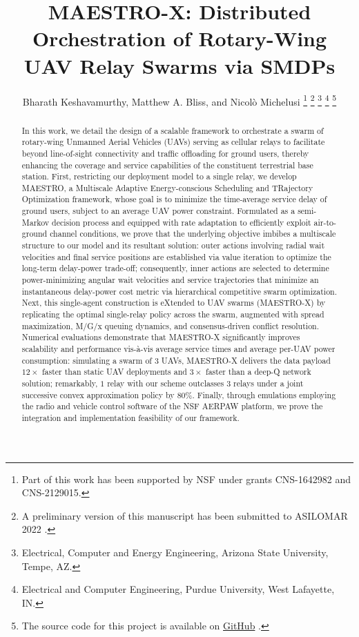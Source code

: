 \documentclass[12pt, draftcls, onecolumn]{IEEEtran}
\title{MAESTRO-X: Distributed Orchestration of Rotary-Wing UAV Relay Swarms via SMDPs}
\author{Bharath Keshavamurthy\IEEEauthorrefmark{1}, Matthew A. Bliss\IEEEauthorrefmark{2}, and Nicol\`{o} Michelusi\IEEEauthorrefmark{1}
\thanks{Part of this work has been supported by NSF under grants CNS-1642982 and CNS-2129015.}
\thanks{A preliminary version of this manuscript has been submitted to ASILOMAR 2022 \cite{ASILOMAR}.}
\thanks{\IEEEauthorrefmark{1}Electrical, Computer and Energy Engineering, Arizona State University, Tempe, AZ.}
\thanks{\IEEEauthorrefmark{2}Electrical and Computer Engineering, Purdue University, West Lafayette, IN.}
\thanks{The source code for this project is available on \href{https://github.com/bharathkeshavamurthy/MAESTRO-X.git}{GitHub} \cite{MAESTRO-X}.}
\vspace{-6mm}
}
\theoremstyle{plain}
\theoremstyle{definition}
\theoremstyle{remark}
\begin{document}

\maketitle
\thispagestyle{plain}
\pagestyle{plain}
\vspace{-14mm}


\begin{abstract}
In this work, we detail the design of a scalable framework to orchestrate a swarm of rotary-wing Unmanned Aerial Vehicles (UAVs) serving as cellular relays to facilitate beyond line-of-sight connectivity and traffic offloading for ground users, thereby enhancing the coverage and service capabilities of the constituent terrestrial base station. First, restricting our deployment model to a single relay, we develop MAESTRO, a Multiscale Adaptive Energy-conscious Scheduling and TRajectory Optimization framework, whose goal is to minimize the time-average service delay of ground users, subject to an average UAV power constraint. Formulated as a semi-Markov decision process and equipped with rate adaptation to efficiently exploit air-to-ground channel conditions, we prove that the underlying objective imbibes a multiscale structure to our model and its resultant solution: outer actions involving radial wait velocities and final service positions are established via value iteration to optimize the long-term delay-power trade-off; consequently, inner actions are selected to determine power-minimizing angular wait velocities and service trajectories that minimize an instantaneous delay-power cost metric via hierarchical competitive swarm optimization. Next, this single-agent construction is eXtended to UAV swarms (MAESTRO-X) by replicating the optimal single-relay policy across the swarm, augmented with spread maximization, M/G/x queuing dynamics, and consensus-driven conflict resolution. Numerical evaluations demonstrate that MAESTRO-X significantly improves scalability and performance vis-à-vis average service times and average per-UAV power consumption: simulating a swarm of $3$ UAVs, MAESTRO-X delivers the data payload $12\times$ faster than static UAV deployments and $3\times$ faster than a deep-Q network solution; remarkably, $1$ relay with our scheme outclasses $3$ relays under a joint successive convex approximation policy by $80$\%. Finally, through emulations employing the radio and vehicle control software of the NSF AERPAW platform, we prove the integration and implementation feasibility of our framework.
\end{abstract}
\vspace{-4mm}
\end{document}

